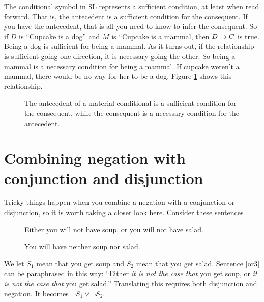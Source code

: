 The conditional symbol in SL represents a sufficient condition, at least when read forward. That is, the antecedent is a sufficient condition for the consequent. If you have the antecedent, that is all you need to know to infer the consequent. So if $D$ is ``Cupcake is a dog'' and $M$ is ``Cupcake is a mammal, then $D \mathrel{\rightarrow} C$ is true. Being a dog is sufficient for being a mammal. As it turns out, if the relationship is sufficient going one direction, it is necessary going the other. So being a mammal is a necessary condition for being a mammal. If cupcake weren't a mammal, there would be no way for her to be a dog. Figure \ref{fig:necessary_and_sufficient} shows this relationship.

\begin{figure}
\centering
{}
\caption{The antecedent of a material conditional is a sufficient condition for the consequent, while the consequent is a necessary condition for the antecedent.}
\label{fig:necessary_and_sufficient}
\end{figure}


\section{Combining negation with conjunction and disjunction}

Tricky things happen when you combine a negation with a conjunction or disjunction, so it is worth taking a closer look here. Consider these sentences

\begin{description}
\item[] Either you will not have soup, or you will not have salad.
\item[] You will have neither soup nor salad.
\end{description}

We let $S_1$ mean that you get soup and $S_2$ mean that you get salad. Sentence \ref{or3} can be paraphrased in this way: ``Either \emph{it is not the case that} you get soup, or \emph{it is not the case that} you get salad.'' Translating this requires both disjunction and negation. It becomes $\lnot S_1 \lor \lnot S_2$.

